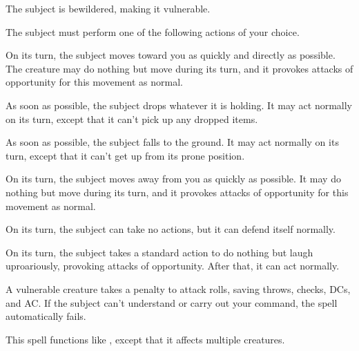 \spellrng{\rngmed}
\begin{spellhealthy}
  The subject is bewildered, making it vulnerable.
\end{spellhealthy}
\begin{spellblood}
  The subject must perform one of the following actions of your choice.
  \par {} On its turn, the subject moves toward you as quickly and directly as possible. The creature may do nothing but move during its turn, and it provokes attacks of opportunity for this movement as normal.
  \par {} As soon as possible, the subject drops whatever it is holding. It may act normally on its turn, except that it can't pick up any dropped items.
  \par {} As soon as possible, the subject falls to the ground. It may act normally on its turn, except that it can't get up from its prone position.
  \par {} On its turn, the subject moves away from you as quickly as possible. It may do nothing but move during its turn, and it provokes attacks of opportunity for this movement as normal.
  \par {} On its turn, the subject can take no actions, but it can defend itself normally.
  \par {} On its turn, the subject takes a standard action to do nothing but laugh uproariously, provoking attacks of opportunity. After that, it can act normally.
\end{spellblood}
\begin{spellnotes}
  A vulnerable creature takes a  penalty to attack rolls, saving throws, checks, DCs, and AC.
  If the subject can't understand or carry out your command, the spell automatically fails.
\end{spellnotes}

\begin{spelleffect}
  This spell functions like , except that it affects multiple creatures.
\end{spelleffect}

